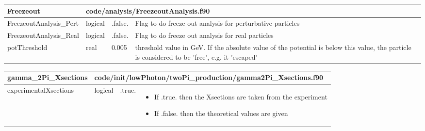 \documentclass{article}
\begin{document}
\begin{longtable}{llll}
\toprule
\textbf{\large{Freezeout}} & \multicolumn{3}{l}{\footnotesize{code/analysis/FreezeoutAnalysis.f90}}\\*
\midrule
\endfirsthead
\midrule
\endhead
FreezeoutAnalysis\_Pert & \begin{minipage}[t]{2cm}logical\end{minipage} & \begin{minipage}[t]{2cm}.false.\end{minipage} & \begin{minipage}[t]{12cm}Flag to do freeze out analysis for perturbative particles\end{minipage}\\*
\midrule
FreezeoutAnalysis\_Real & \begin{minipage}[t]{2cm}logical\end{minipage} & \begin{minipage}[t]{2cm}.false.\end{minipage} & \begin{minipage}[t]{12cm}Flag to do freeze out analysis for real particles\end{minipage}\\*
\midrule
potThreshold & \begin{minipage}[t]{2cm}real\end{minipage} & \begin{minipage}[t]{2cm}0.005\end{minipage} & \begin{minipage}[t]{12cm}threshold value in GeV. If the absolute value of the potential is below this value, the particle is considered to be 'free', e.g. it 'escaped'\end{minipage}\\*
\bottomrule
\end{longtable}
{ }




\begin{longtable}{llll}
\toprule
\textbf{\large{gamma\_2Pi\_Xsections}} & \multicolumn{3}{l}{\footnotesize{code/init/lowPhoton/twoPi\_production/gamma2Pi\_Xsections.f90}}\\*
\midrule
\endfirsthead
\midrule
\endhead
experimentalXsections & \begin{minipage}[t]{2cm}logical\end{minipage} & \begin{minipage}[t]{2cm}.true.\end{minipage} & \begin{minipage}[t]{12cm}\begin{itemize}\leftmargin0em\itemindent0pt\item If .true. then the Xsections are taken from the experiment\item If .false. then the theoretical values are given\end{itemize}\end{minipage}\\*
\bottomrule
\end{longtable}
{ }
\end{document}
